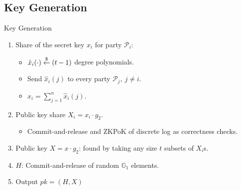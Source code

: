 \documentclass[
	xcolor={svgnames},
	hyperref={pagebackref,bookmarks},
	aspectratio=43,
]{beamer}
\begin{document}
\subsection{Key Generation}
\begin{frame}{Key Generation}
	\begin{enumerate}
		\item Share of the secret key $x_i$ for party $\mathcal{P}_i$: %
		\begin{itemize}
			\item $\hat{x}_i(\cdot) \stackrel{\$}{\leftarrow} (t-1)$ degree polynomials. 
			\item Send $\hat{x}_i(j)$ to every party $\mathcal{P}_j,\ j \neq i$.
			\item $x_i = \sum_{j=1}^{n} \hat{x}_i(j)$.
		\end{itemize}
		\item Public key share $X_i = x_i \cdot g_2$.
		\begin{itemize}
			\item Commit-and-release and ZKPoK of discrete log as correctness checks. %
		\end{itemize}
		\item Public key $X = x \cdot g_2$: found by taking any size $t$ subsets of $X_i$s. 
		\item $H$: Commit-and-release of random $\mathbb{G}_1$ elements.
		\item Output $pk = (H, X)$
	\end{enumerate}
\end{frame}
\end{document}
